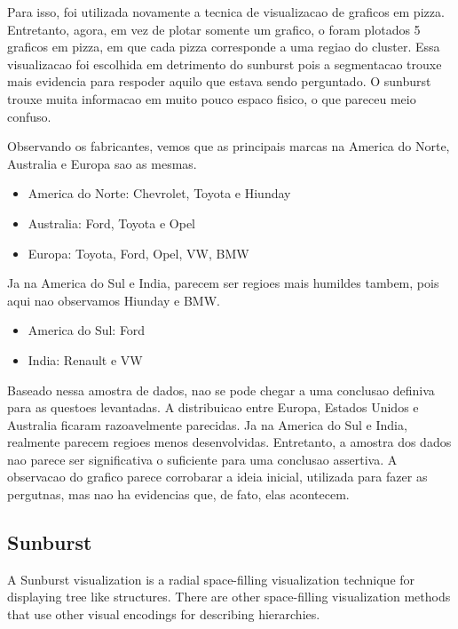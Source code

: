 \documentclass[10pt, conference]{IEEEtran}
\begin{document}
Para isso, foi utilizada novamente a tecnica de visualizacao de graficos em pizza. Entretanto, agora,
em vez de plotar somente um grafico, o foram plotados 5 graficos em pizza, em que cada pizza corresponde
a uma regiao do cluster. Essa visualizacao foi escolhida em detrimento do sunburst pois a segmentacao
trouxe mais evidencia para respoder aquilo que estava sendo perguntado. O sunburst trouxe muita informacao
em muito pouco espaco fisico, o que pareceu meio confuso.

Observando os fabricantes, vemos que as principais marcas na America do Norte, Australia e Europa
sao as mesmas.

\begin{itemize}
  \item America do Norte: Chevrolet, Toyota e Hiunday
  \item Australia: Ford, Toyota e Opel
  \item Europa: Toyota, Ford, Opel, VW, BMW
\end{itemize}

Ja na America do Sul e India, parecem ser regioes mais humildes tambem, pois aqui nao observamos
Hiunday e BMW.

\begin{itemize}
  \item America do Sul: Ford
  \item India: Renault e VW
\end{itemize}

Baseado nessa amostra de dados, nao se pode chegar a uma conclusao definiva para as
questoes levantadas. A distribuicao entre Europa, Estados Unidos e Australia ficaram razoavelmente
parecidas. Ja na America do Sul e India, realmente parecem regioes menos desenvolvidas. Entretanto,
a amostra dos dados nao parece ser significativa o suficiente para uma conclusao assertiva. A observacao
do grafico parece corrobarar a ideia inicial, utilizada para fazer as pergutnas, mas nao ha evidencias
que, de fato, elas acontecem.



\subsection{Sunburst}

A Sunburst visualization is a radial space-filling visualization technique for displaying tree like structures. 
There are other space-filling visualization methods that use other visual encodings for describing hierarchies.
\end{document}
